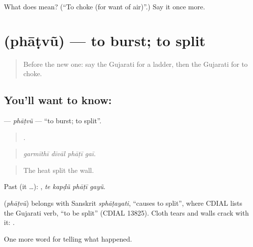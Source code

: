 \begin{tcolorbox}[breakable,colback=teal!4,colframe=teal!35!black,title={Before you move on}]
What does  mean? (\textquotedblleft{}To choke (for want of air)\textquotedblright{}.) Say it once more.
\end{tcolorbox}
\section[\texorpdfstring{\gu{ફાટવું} (phāṭvũ)}{ફાટવું (phāṭvũ)}]{ (phāṭvũ) — to burst; to split}

\label{lesson:GU-C301-phatvu}



\begin{quote}
Before the new one: say the Gujarati for a ladder, then the Gujarati for to choke.
\end{quote}

\subsection*{You'll want to know: }
\textbf{} — \emph{phāṭvũ} — \textquotedblleft{}to burst; to split\textquotedblright{}.

\begin{quote}
   .
\end{quote}

\begin{quote}
\emph{garmīthī dīvāl phāṭī gaī.}
\end{quote}

\begin{quote}
The heat split the wall.
\end{quote}

Past (it …):    , \emph{te kapḍũ phāṭī gayũ}.

\begin{cousinweb}
\textbf{} (\emph{phāṭvũ}) belongs with Sanskrit \emph{sphāṭayati}, \textquotedblleft{}causes to split\textquotedblright{}, where CDIAL lists the Gujarati verb, \textquotedblleft{}to be split\textquotedblright{} (CDIAL 13825). Cloth tears and walls crack with it: \textbf{ }.
\end{cousinweb}

\begin{grammarlens}[title={What you've built}]
One more word for telling what happened.
\end{grammarlens}


